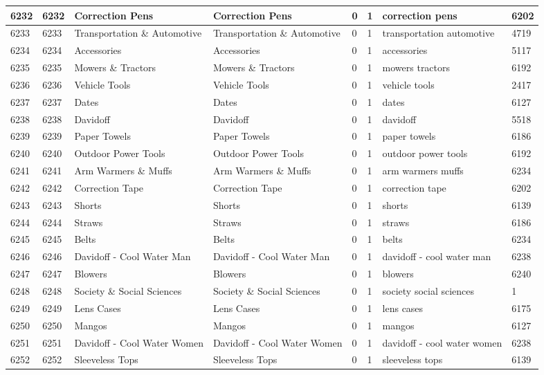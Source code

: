 \begin{longtable}{|l|l|l|l|l|l|l|l|}
6232 & 6232 & Correction Pens & Correction Pens & 0 & 1 & correction pens & 6202 \\ \hline 
6233 & 6233 & Transportation \& Automotive & Transportation \& Automotive & 0 & 1 & transportation automotive & 4719 \\ \hline 
6234 & 6234 & Accessories & Accessories & 0 & 1 & accessories & 5117 \\ \hline 
6235 & 6235 & Mowers \& Tractors & Mowers \& Tractors & 0 & 1 & mowers tractors & 6192 \\ \hline 
6236 & 6236 & Vehicle Tools & Vehicle Tools & 0 & 1 & vehicle tools & 2417 \\ \hline 
6237 & 6237 & Dates & Dates & 0 & 1 & dates & 6127 \\ \hline 
6238 & 6238 & Davidoff & Davidoff & 0 & 1 & davidoff & 5518 \\ \hline 
6239 & 6239 & Paper Towels & Paper Towels & 0 & 1 & paper towels & 6186 \\ \hline 
6240 & 6240 & Outdoor Power Tools & Outdoor Power Tools & 0 & 1 & outdoor power tools & 6192 \\ \hline 
6241 & 6241 & Arm Warmers \& Muffs & Arm Warmers \& Muffs & 0 & 1 & arm warmers muffs & 6234 \\ \hline 
6242 & 6242 & Correction Tape & Correction Tape & 0 & 1 & correction tape & 6202 \\ \hline 
6243 & 6243 & Shorts & Shorts & 0 & 1 & shorts & 6139 \\ \hline 
6244 & 6244 & Straws & Straws & 0 & 1 & straws & 6186 \\ \hline 
6245 & 6245 & Belts & Belts & 0 & 1 & belts & 6234 \\ \hline 
6246 & 6246 & Davidoff - Cool Water Man & Davidoff - Cool Water Man & 0 & 1 & davidoff - cool water man & 6238 \\ \hline 
6247 & 6247 & Blowers & Blowers & 0 & 1 & blowers & 6240 \\ \hline 
6248 & 6248 & Society \& Social Sciences & Society \& Social Sciences & 0 & 1 & society social sciences & 1 \\ \hline 
6249 & 6249 & Lens Cases & Lens Cases & 0 & 1 & lens cases & 6175 \\ \hline 
6250 & 6250 & Mangos & Mangos & 0 & 1 & mangos & 6127 \\ \hline 
6251 & 6251 & Davidoff - Cool Water Women & Davidoff - Cool Water Women & 0 & 1 & davidoff - cool water women & 6238 \\ \hline 
6252 & 6252 & Sleeveless Tops & Sleeveless Tops & 0 & 1 & sleeveless tops & 6139 \\ \hline 

\end{longtable}
